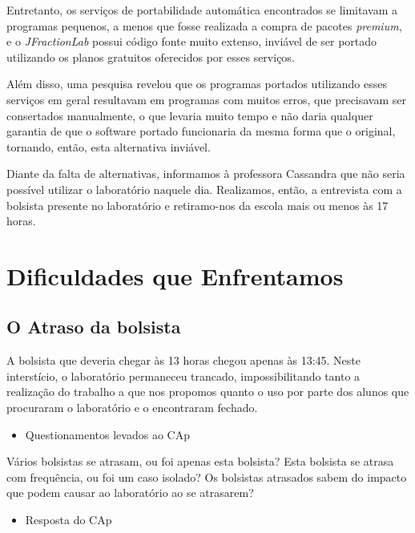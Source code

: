 Entretanto, os serviços de portabilidade automática encontrados se limitavam a programas pequenos, a menos que fosse realizada a compra de pacotes \textit{premium}, e o \textit{JFractionLab} possui código fonte muito extenso, inviável de ser portado utilizando os planos gratuitos oferecidos por esses serviços.

Além disso, uma pesquisa revelou que os programas portados utilizando esses serviços em geral resultavam em programas com muitos erros, que precisavam ser consertados manualmente, o que levaria muito tempo e não daria qualquer garantia de que o software portado funcionaria da mesma forma que o original, tornando, então, esta alternativa inviável.

Diante da falta de alternativas, informamos à professora Cassandra que não seria possível utilizar o laboratório naquele dia. Realizamos, então, a entrevista com a bolsista presente no laboratório e retiramo-nos da escola mais ou menos às 17 horas.

\section{Dificuldades que Enfrentamos}\label{sec:LABEL_CHP_REL_SEC_PROBS}

\subsection{O Atraso da bolsista}\label{sec:LABEL_CHP_REL_SEC_PROBS_SUBSEC_ATR}

A bolsista que deveria chegar às 13 horas chegou apenas às 13:45. Neste interstício, o laboratório permaneceu trancado, impossibilitando tanto a realização do trabalho a que nos propomos quanto o uso por parte dos alunos que procuraram o laboratório e o encontraram fechado.

\begin{itemize}
    \item Questionamentos levados ao CAp
\end{itemize}

Vários bolsistas se atrasam, ou foi apenas esta bolsista? Esta bolsista se atrasa com frequência, ou foi um caso isolado? Os bolsistas atrasados sabem do impacto que podem causar ao laboratório ao se atrasarem?

\begin{itemize}
    \item Resposta do CAp
\end{itemize}

